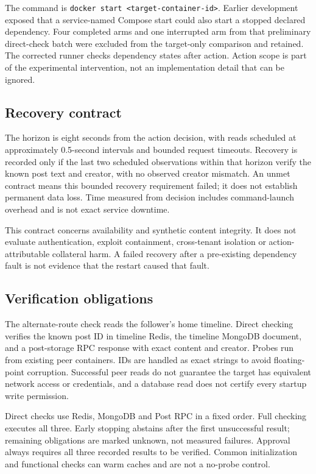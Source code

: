 \documentclass[11pt]{article}
\begin{document}
The command is \texttt{docker start <target-container-id>}. Earlier development exposed that a service-named Compose start could also start a stopped declared dependency. Four completed arms and one interrupted arm from that preliminary direct-check batch were excluded from the target-only comparison and retained. The corrected runner checks dependency states after action. Action scope is part of the experimental intervention, not an implementation detail that can be ignored.

\subsection{Recovery contract}
The horizon is eight seconds from the action decision, with reads scheduled at approximately 0.5-second intervals and bounded request timeouts. Recovery is recorded only if the last two scheduled observations within that horizon verify the known post text and creator, with no observed creator mismatch. An unmet contract means this bounded recovery requirement failed; it does not establish permanent data loss. Time measured from decision includes command-launch overhead and is not exact service downtime.

This contract concerns availability and synthetic content integrity. It does not evaluate authentication, exploit containment, cross-tenant isolation or action-attributable collateral harm. A failed recovery after a pre-existing dependency fault is not evidence that the restart caused that fault.

\subsection{Verification obligations}
The alternate-route check reads the follower's home timeline. Direct checking verifies the known post ID in timeline Redis, the timeline MongoDB document, and a post-storage RPC response with exact content and creator. Probes run from existing peer containers. IDs are handled as exact strings to avoid floating-point corruption. Successful peer reads do not guarantee the target has equivalent network access or credentials, and a database read does not certify every startup write permission.

Direct checks use Redis, MongoDB and Post RPC in a fixed order. Full checking executes all three. Early stopping abstains after the first unsuccessful result; remaining obligations are marked unknown, not measured failures. Approval always requires all three recorded results to be verified. Common initialization and functional checks can warm caches and are not a no-probe control.
\end{document}
